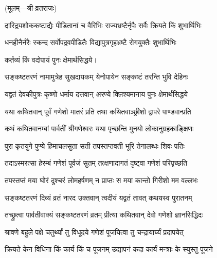 \centerline{\small{(मूलम्—श्री-व्रतराजः)}}


\twolineshloka
{दारिद्र्यशोककष्टाद्यैः पीडितानां च वैरिभिः}
{राज्यभ्रष्टैर्नृपैः सर्वैः क्रियते किं शुभार्थिभिः} %


\twolineshloka
{धनहीनैर्नरैः स्कन्द सर्वोपद्रवपीडितैः}
{विद्यापुत्रगृहभ्रष्टै रोगयुक्तैः शुभार्थिभिः} %

कर्तव्यं किं वदोपायं पुनः क्षेमार्थसिद्धये।\\


\twolineshloka
{सङ्कष्टतरणं नामामुत्रेह सुखदायकम्}
{येनोपायेन सङ्कष्टं तरन्ति भुवि देहिनः} %


\twolineshloka
{यद्व्रतं देवकीपुत्रः कृष्णो धर्माय दत्तवान्}
{अरण्ये क्लिश्यमानाय पुनः क्षेमार्थसिद्धये} %


\twolineshloka
{यथा कथितवान् पूर्वं गणेशो मातरं प्रति}
{तथा कथितवाञ्छ्रीशो द्वापरे पाण्डवान्प्रति} %


\twolineshloka
{कथं कथितवानम्बां पार्वतीं श्रीगणेश्वरः}
{यथा पृच्छन्ति मुनयो लोकानुग्रहकाङ्क्षिणः} %


\twolineshloka
{पुरा कृतयुगे पुण्ये हिमाचलसुता सती}
{तपस्तप्तवती भूरि तेनालब्धः शिवः पतिः\footnotemark} %


\twolineshloka
{तदाऽस्मरत्सा हेरम्बं गणेशं पूर्वजं सुतम्}
{तत्क्षणादागतं दृष्ट्वा गणेशं परिपृच्छति} %


\twolineshloka
{तपस्तप्तं मया घोरं दुश्चरं लोमहर्षणम्}
{न प्राप्तः स मया कान्तो गिरीशो मम वल्लभः} %


\twolineshloka
{सङ्कष्टतरणं दिव्यं व्रतं नारद उक्तवान्}
{त्वदीयं यद्व्रतं तावत् कथयस्व पुरातनम्} %


\twolineshloka
{तच्छ्रुत्वा पार्वतीवाक्यं सङ्कष्टतरणं व्रतम्}
{प्रीत्या कथितवान् देवो गणेशो ज्ञानसिद्धिदः} %


\twolineshloka
{श्रावणे बहुले पक्षे चतुर्थ्यां तु विधूदये}
{गणेशं पूजयित्वा तु चन्द्रायार्घ्यं प्रदापयेत्} %


\twolineshloka
{क्रियते केन विधिना किं कार्य किं च पूजनम्}
{उद्यापनं कदा कार्यं मन्त्राः के स्युस्तु पूजने} %

